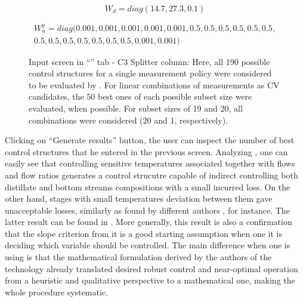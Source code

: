 \documentclass[../../msc-thesis.tex]{subfiles}
\begin{document}
\begin{equation}
	W_{d} = diag(14.7, 27.3, 0.1)
	\label{eq:wdc3}
\end{equation}

\begin{equation}
    \begin{split}
        W_{n}^{y} = diag(0.001,0.001,0.001,0.001,0.001,0.5,0.5,0.5,0.5,0.5,0.5,\\
        0.5,0.5,0.5,0.5,0.5,0.5,0.5,0.001,0.001)
        \label{eq:wnyc3}
    \end{split}
\end{equation}

\begin{figure}[htb]
    \centering
    \caption{Input screen in \mtc ``\soc'' tab - C3 Splitter column: Here, all 
    190 possible control structures for a single measurement policy were 
    considered to be evaluated by \mtc. For linear combinations of 
    measurements as CV candidates, the 50 best ones of each possible 
    subset size were evaluated, when possible. For subset sizes of 19 and 
    20, all combinations were considered (20 and 1, respectively).}
    \label{fig:c3splittersocinput}
\end{figure}

Clicking on ``Generate results'' button, the user can inspect the number of 
best control structures that he entered in the previous screen. Analyzing 
, one can easily see that controlling sensitive 
temperatures associated together with flows and flow ratios generates a 
control strucutre capable of indirect controlling both distillate and bottom 
streams compositions with a small incurred loss. On the other hand, stages 
with small temperatures deviation between them gave unacceptable losses, 
similarly as found by different authors \textcite{Alves2018,Hori2007}, for 
instance. The latter result can be found in . 
More generally, this result is also a confirmation that the slope criterion 
from \textcite{Luyben2006} it is a good starting assumption when one
it is deciding which variable should be controlled. The main difference when 
one is using \soc is that the mathematical formulation derived by the 
authors of the technology already translated desired robust control and 
near-optimal operation from a heuristic and qualitative perspective to 
a mathematical one, making the whole procedure systematic.
\end{document}
